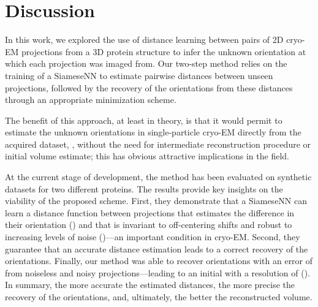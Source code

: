\section{Discussion}\label{sec:discussion}

In this work, we explored the use of distance learning between pairs of 2D cryo-EM projections from a 3D protein structure to infer the unknown orientation at which each projection was imaged from.
Our two-step method relies on the training of a SiameseNN to estimate pairwise distances between unseen projections, followed by the recovery of the orientations from these distances through an appropriate minimization scheme.

The benefit of this approach, at least in theory, is that it would permit to estimate the unknown orientations in single-particle cryo-EM directly from the acquired dataset, \ie, without the need for intermediate reconstruction procedure or initial volume estimate; this has obvious attractive implications in the field.

At the current stage of development, the method has been evaluated on synthetic datasets for two different proteins.
The results provide key insights on the viability of the proposed scheme.
First, they demonstrate that a SiameseNN can learn a distance function between projections that estimates the difference in their orientation () and that is invariant to off-centering shifts and robust to increasing levels of noise ()---an important condition in cryo-EM\@.
Second, they guarantee that an accurate distance estimation leads to a correct recovery of the orientations. %
Finally, our method was able to recover orientations with an error of  from noiseless and noisy projections---leading to an initial  with a resolution of  ().
In summary, the more accurate the estimated distances, the more precise the recovery of the orientations, and, ultimately, the better the reconstructed volume.

